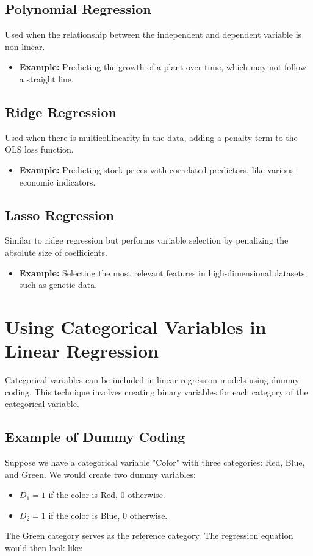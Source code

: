 \documentclass{article}
\begin{document}
\subsection{Polynomial Regression}
Used when the relationship between the independent and dependent variable is non-linear.
\begin{itemize}
    \item \textbf{Example:} Predicting the growth of a plant over time, which may not follow a straight line.
\end{itemize}

\subsection{Ridge Regression}
Used when there is multicollinearity in the data, adding a penalty term to the OLS loss function.
\begin{itemize}
    \item \textbf{Example:} Predicting stock prices with correlated predictors, like various economic indicators.
\end{itemize}

\subsection{Lasso Regression}
Similar to ridge regression but performs variable selection by penalizing the absolute size of coefficients.
\begin{itemize}
    \item \textbf{Example:} Selecting the most relevant features in high-dimensional datasets, such as genetic data.
\end{itemize}

\newpage
\section{Using Categorical Variables in Linear Regression}

Categorical variables can be included in linear regression models using dummy coding. This technique involves creating binary variables for each category of the categorical variable.

\subsection{Example of Dummy Coding}
Suppose we have a categorical variable "Color" with three categories: Red, Blue, and Green. We would create two dummy variables:
\begin{itemize}
    \item \(D_1 = 1\) if the color is Red, 0 otherwise.
    \item \(D_2 = 1\) if the color is Blue, 0 otherwise.
\end{itemize}
The Green category serves as the reference category. The regression equation would then look like:
\end{document}
